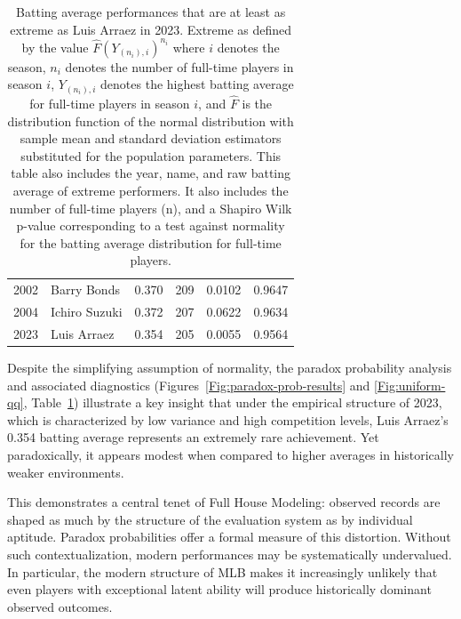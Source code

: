 \documentclass[12pt]{article}
\begin{document}
\begin{table}[H]
\begin{tabular}{rlcccc}
  2002 & Barry Bonds & 0.370 & 209 & 0.0102 & 0.9647 \\ 
  2004 & Ichiro Suzuki & 0.372 & 207 & 0.0622 & 0.9634 \\ 
  2023 & Luis Arraez & 0.354 & 205 & 0.0055 & 0.9564 \\ 
   \hline
\end{tabular}
\caption{Batting average performances that are at least as extreme as Luis Arraez in 2023. Extreme as defined by the value $\widehat{F}(Y_{(n_i),i})^{n_i}$ where $i$ denotes the season, $n_i$ denotes the number of full-time players in season $i$, $Y_{(n_i),i}$ denotes the highest batting average for full-time players in season $i$, and $\widehat{F}$ is the distribution function of the normal distribution with sample mean and standard deviation estimators substituted for the population parameters. This table also includes the year, name, and raw batting average of extreme performers. It also includes the number of full-time players (n), and a Shapiro Wilk p-value corresponding to a test against normality for the batting average distribution for full-time players.}
\label{Tab:extreme-performers}
\end{table}

Despite the simplifying assumption of normality, the paradox probability analysis and associated diagnostics (Figures~\ref{Fig:paradox-prob-results} and \ref{Fig:uniform-qq}, Table~\ref{Tab:extreme-performers}) illustrate a key insight that under the empirical structure of 2023, which is characterized by low variance and high competition levels, Luis Arraez's 0.354 batting average represents an extremely rare achievement. Yet paradoxically, it appears modest when compared to higher averages in historically weaker environments. 

This demonstrates a central tenet of Full House Modeling: observed records are shaped as much by the structure of the evaluation system as by individual aptitude. Paradox probabilities offer a formal measure of this distortion. Without such contextualization, modern performances may be systematically undervalued. In particular, the modern structure of MLB makes it increasingly unlikely that even players with exceptional latent ability will produce historically dominant observed outcomes.



\end{document}

